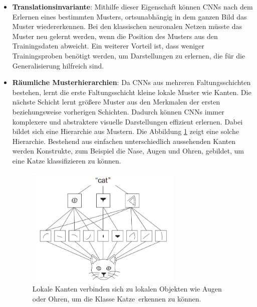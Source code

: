 \begin{itemize}
	\item \textbf{Translationsinvariante}: Mithilfe dieser Eigenschaft können CNNs nach dem Erlernen eines bestimmten Musters, ortsunabhängig in dem ganzen Bild das Muster wiedererkennen. Bei den klassischen neuronalen Netzen müsste das Muster neu gelernt werden, wenn die Position des Musters aus den Trainingsdaten abweicht. 
	Ein weiterer Vorteil ist, dass weniger Trainingsproben benötigt werden, um Darstellungen zu erlernen, die für die Generalisierung hilfreich sind.
	
	\item \textbf{Räumliche Musterhierarchien}: Da CNNs aus mehreren Faltungsschichten bestehen, lernt die erste Faltungsschicht kleine lokale Muster wie Kanten. Die nächste Schicht lernt größere Muster aus den Merkmalen der ersten beziehungsweise vorherigen Schichten. Dadurch können CNNs immer komplexere und abstraktere visuelle Darstellungen effizient erlernen. Dabei bildet sich eine Hierarchie aus Mustern. Die Abbildung \ref{cat_pattern} zeigt eine solche Hierarchie. Bestehend aus einfachen unterschiedlich aussehenden Kanten werden Konstrukte, zum Beispiel die Nase, Augen und Ohren, gebildet, um eine Katze klassifizieren zu können.
	

	\begin{figure}[h!]
		\centering
		\includegraphics[width=0.7\textwidth]{bilder/cat_pattern.PNG}
		\caption{Lokale Kanten verbinden sich zu lokalen Objekten wie Augen oder Ohren, um die Klasse \glqq Katze\grqq~erkennen zu können\cite{francois}.}
		\label{cat_pattern}
	\end{figure}
	
\end{itemize}



